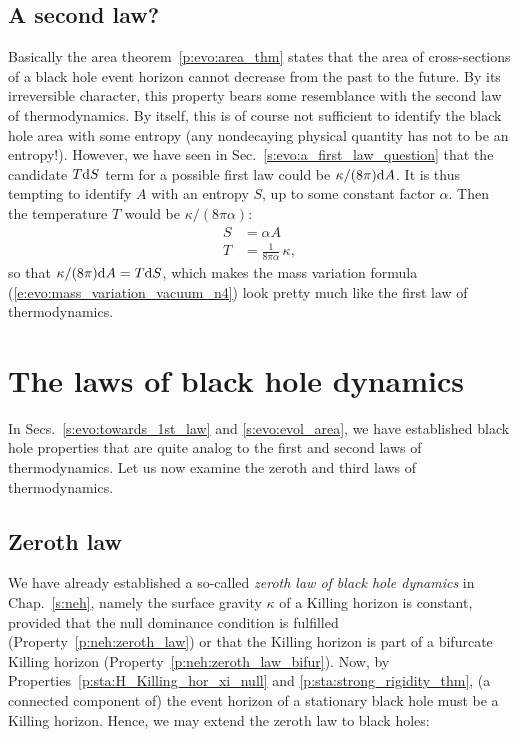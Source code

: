 \subsection{A second law?}

Basically the area theorem~\ref{p:evo:area_thm} states that
the area of cross-sections of a black hole event horizon
cannot decrease from the past to the future.
By its irreversible character, this property bears some resemblance
with the second law of thermodynamics.
By itself, this is of course not sufficient to identify the black hole area
with some entropy (any nondecaying physical quantity has not to be an entropy!).
However, we have seen in Sec.~\ref{s:evo:a_first_law_question} that the
candidate $T\mathrm{d} S$ term for a possible first law could be $\kappa/(8\pi)\mathrm{d} A$.
It is thus tempting to identify $A$ with an entropy $S$, up to some
constant factor $\alpha$. Then the temperature $T$ would be $\kappa/(8\pi\alpha)$:
\begin{subequations}
\label{e:evo:identif_S_T}
\begin{align}
  S & = \alpha A \label{e:evo:identif_S_A}\\
  T &= \frac{1}{8 \pi\alpha}\, \kappa , \label{e:evo:identif_T_kappa}
\end{align}
\end{subequations}
so that $\kappa/(8\pi)\mathrm{d} A = T\mathrm{d} S$, which makes
the mass variation formula (\ref{e:evo:mass_variation_vacuum_n4}) look pretty much like
the first law of thermodynamics.


\section{The laws of black hole dynamics} \label{s:evo:BHdynamics}

In Secs.~\ref{s:evo:towards_1st_law} and \ref{s:evo:evol_area}, we have established black hole
properties that are quite analog to the first and second laws of thermodynamics. Let us now
examine the zeroth and third laws of thermodynamics.

\subsection{Zeroth law}

We have already established a so-called \emph{zeroth law of black hole dynamics}
in Chap.~\ref{s:neh}, namely the surface gravity
$\kappa$ of a Killing horizon is constant, provided that the
null dominance condition is fulfilled (Property~\ref{p:neh:zeroth_law})
or that the Killing horizon is part of a bifurcate Killing horizon
(Property~\ref{p:neh:zeroth_law_bifur}).
Now, by Properties~\ref{p:sta:H_Killing_hor_xi_null}
and \ref{p:sta:strong_rigidity_thm}, (a connected component of) the event horizon
of a stationary black hole must be a Killing horizon. Hence, we may extend
the zeroth law to black holes:

